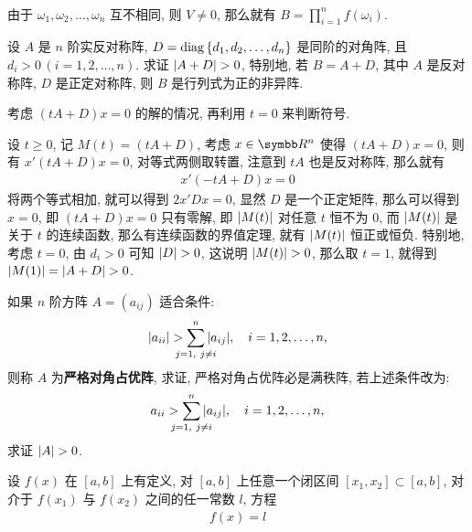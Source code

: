 \begin{exercise}[series=exer]
\begin{answer}
\begin{align*}
        \end{align*} 
        由于 $ \omega_{1}, \omega_{2}, \dots, \omega_{n} $ 互不相同, 则 $ V \ne 0 $, 那么就有 $ B = \prod_{i = 1}^{n}f(\omega_{i}) $.
    \end{answer}
    \sitem\label{item:反称加对角} 设 $ A $ 是 $ n $ 阶实反对称阵, $ D = \operatorname{diag}\qty{d_{1}, d_{2}, \dots, d_{n}} $ 是同阶的对角阵, 且 $ d_{i} > 0\,(i = 1, 2, \dots, n) $. 求证 $ \abs{A + D} > 0 $, 特别地, 若 $ B = A + D $, 其中 $ A $ 是反对称阵, $ D $ 是正定对称阵, 则 $ B $ 是行列式为正的非异阵. 
    \begin{hint}
        考虑 $ (tA + D)x = 0 $ 的解的情况, 再利用 $ t = 0 $ 来判断符号. 
    \end{hint}
    \begin{answer}
        设 $ t \ge 0 $, 记 $ M(t) = (tA + D) $, 考虑 $ x \in \R^{n} $ 使得 $ (tA + D)x = 0 $, 则有 $ x'(tA + D)x = 0 $, 对等式两侧取转置, 注意到 $ tA $ 也是反对称阵, 那么就有
        \begin{align*}
            x'(-tA + D)x = 0
        \end{align*}
        将两个等式相加, 就可以得到 $ 2x'Dx = 0 $, 显然 $ D $ 是一个正定矩阵, 那么可以得到 $ x = 0 $, 即 $ (tA + D)x = 0 $ 只有零解, 即 $ \abs{M(t)} $ 对任意 $ t $ 恒不为 $ 0 $, 而 $ \abs{M(t)} $ 是关于 $ t $ 的连续函数, 那么有连续函数的界值定理, 就有 $ \abs{M(t)} $ 恒正或恒负. 特别地, 考虑 $ t = 0 $, 由 $ d_{i} > 0 $ 可知 $ \abs{D} > 0 $, 这说明 $ \abs{M(t)} > 0 $, 那么取 $ t = 1 $, 就得到 $ \abs{M(1)} = \abs{A + D} > 0 $. 
    \end{answer}
    \item 如果 $ n $ 阶方阵 $ A = (a_{ij}) $ 适合条件:
    \begin{align*}
        \abs{a_{ii}} > \sum_{\mathclap{j = 1,\ j \ne i}}^{n} \abs{a_{ij}}, \quad i = 1, 2, \dots, n,
    \end{align*}
    则称 $ A $ 为\textbf{严格对角占优阵}, 求证, 严格对角占优阵必是满秩阵, 若上述条件改为:
    \begin{align*}
        a_{ii} > \sum_{\mathclap{j = 1,\ j \ne i}}^{n} \abs{a_{ij}}, \quad i = 1, 2, \dots, n,
    \end{align*}   
    求证 $ \abs{A} > 0 $. 
    \item 设 $ f(x) $ 在 $ [a, b] $ 上有定义, 对 $ [a, b] $ 上任意一个闭区间 $ [x_{1}, x_{2}] \subset [a, b] $, 对介于 $ f(x_{1}) $ 与 $ f(x_{2}) $ 之间的任一常数 $ l $, 方程 
    \begin{align*}
        f(x) = l
    \end{align*}

\end{exercise}
